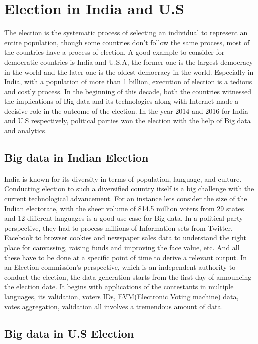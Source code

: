 \documentclass[sigconf]{acmart}
\begin{document}
\section{Election in India and U.S}
 The election is the systematic process of selecting an individual to represent an entire population, though some countries don't follow the same process, most of the countries have a process of election\cite{2:online}.
 A good example to consider for democratic countries is India and U.S.A, the former one is the largest democracy in the world and the later one is the oldest democracy in the world. Especially in India, with a population of more than 1 billion\cite{3:online}, execution of election is a tedious and costly process. In the beginning of this decade, both the countries witnessed the implications of Big data and its technologies along with Internet made a decisive role in the outcome of the election. In the year 2014 and 2016 for India and U.S respectively, political parties won the election with the help of Big data and analytics\cite{6}.
 
 \subsection{Big data in Indian Election}
 India is known for its diversity in terms of population, language, and culture. Conducting election to such a diversified country itself is a big challenge with the current technological advancement. For an instance lets consider the size of the Indian electorate, with the sheer volume of 814.5 million voters from 29 states and 12 different languages is a good use case for Big data\cite{7:online}.
 In a political party perspective, they had to process millions of Information sets from Twitter, Facebook to browser cookies and newspaper sales data to understand the right place for canvassing, raising funds and improving the face value, etc. And all these have to be done at a specific point of time to derive a relevant output. In an Election commission's perspective, which is an independent authority to conduct the election, the data generation starts from the first day of announcing the election date. It begins with applications of the contestants in multiple languages, its validation,  voters IDs, EVM(Electronic Voting machine) data, votes aggregation, validation all involves a tremendous amount of data.
 
 
 \subsection{Big data in U.S Election}
 
\end{document}
